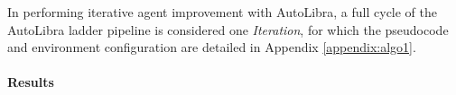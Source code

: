 

In performing iterative agent improvement with AutoLibra, a full cycle of the AutoLibra ladder pipeline is considered one \textit{Iteration}, for which the pseudocode and environment configuration are detailed in Appendix \ref{appendix:algo1}.




\paragraph{Results}

